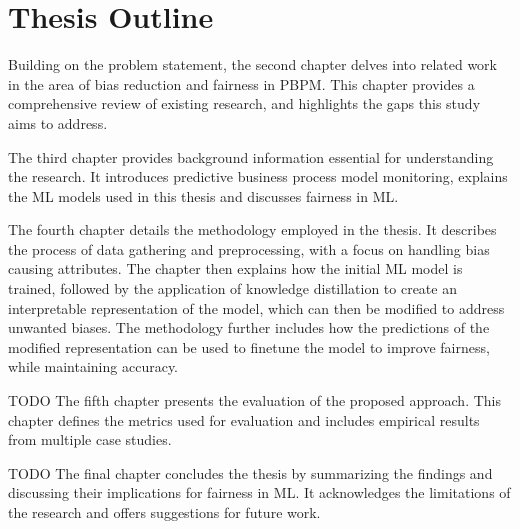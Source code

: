 \section{Thesis Outline}
Building on the problem statement,
the second chapter delves into related work in the area of bias reduction and fairness in PBPM.
This chapter provides a comprehensive review of existing research,
and highlights the gaps this study aims to address.

The third chapter provides background information essential for understanding the research.
It introduces predictive business process model monitoring,
explains the ML models used in this thesis
and discusses fairness in ML.

The fourth chapter details the methodology employed in the thesis.
It describes the process of data gathering and preprocessing, with a focus on handling bias causing attributes.
The chapter then explains how the initial ML model is trained,
followed by the application of knowledge distillation to create an interpretable representation of the model,
which can then be modified to address unwanted biases.
The methodology further includes how the predictions of the modified representation 
can be used to finetune the model to improve fairness, while maintaining accuracy.

TODO
The fifth chapter presents the evaluation of the proposed approach.
This chapter defines the metrics used for evaluation and includes empirical results from multiple case studies.

TODO
The final chapter concludes the thesis by summarizing the findings
and discussing their implications for fairness in ML.
It acknowledges the limitations of the research and offers suggestions for future work.